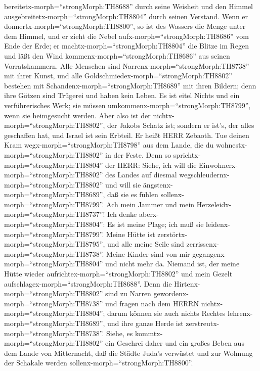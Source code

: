 bereitetx-morph=``strongMorph:TH8688'' durch seine Weisheit und den
Himmel ausgebreitetx-morph=``strongMorph:TH8804'' durch seinen Verstand.
 Wenn er donnertx-morph=``strongMorph:TH8800'', so ist des
Wassers die Menge unter dem Himmel, und er zieht die Nebel
aufx-morph=``strongMorph:TH8686'' vom Ende der Erde; er
machtx-morph=``strongMorph:TH8804'' die Blitze im Regen und läßt den
Wind kommenx-morph=``strongMorph:TH8686'' aus seinen Vorratskammern.
 Alle Menschen sind Narrenx-morph=``strongMorph:TH8738''
mit ihrer Kunst, und alle Goldschmiedex-morph=``strongMorph:TH8802''
bestehen mit Schandenx-morph=``strongMorph:TH8689'' mit ihren Bildern;
denn ihre Götzen sind Trügerei und haben kein Leben.  Es
ist eitel Nichts und ein verführerisches Werk; sie müssen
umkommenx-morph=``strongMorph:TH8799'', wenn sie heimgesucht werden.
 Aber also ist der nichtx-morph=``strongMorph:TH8802'', der
Jakobs Schatz ist; sondern er ist's, der alles geschaffen hat, und
Israel ist sein Erbteil. Er heißt HERR Zebaoth.  Tue deinen
Kram wegx-morph=``strongMorph:TH8798'' aus dem Lande, die du
wohnestx-morph=``strongMorph:TH8802'' in der Feste.  Denn
so sprichtx-morph=``strongMorph:TH8804'' der HERR: Siehe, ich will die
Einwohnerx-morph=``strongMorph:TH8802'' des Landes auf diesmal
wegschleudernx-morph=``strongMorph:TH8802'' und will sie
ängstenx-morph=``strongMorph:TH8689'', daß sie es fühlen
sollenx-morph=``strongMorph:TH8799''.  Ach mein Jammer und
mein Herzeleidx-morph=``strongMorph:TH8737''! Ich denke
aberx-morph=``strongMorph:TH8804'': Es ist meine Plage; ich muß sie
leidenx-morph=``strongMorph:TH8799''.  Meine Hütte ist
zerstörtx-morph=``strongMorph:TH8795'', und alle meine Seile sind
zerrissenx-morph=``strongMorph:TH8738''. Meine Kinder sind von mir
gegangenx-morph=``strongMorph:TH8804'' und nicht mehr da. Niemand ist,
der meine Hütte wieder aufrichtex-morph=``strongMorph:TH8802'' und mein
Gezelt aufschlagex-morph=``strongMorph:TH8688''.  Denn die
Hirtenx-morph=``strongMorph:TH8802'' sind zu Narren
gewordenx-morph=``strongMorph:TH8738'' und fragen nach dem HERRN
nichtx-morph=``strongMorph:TH8804''; darum können sie auch nichts
Rechtes lehrenx-morph=``strongMorph:TH8689'', und ihre ganze Herde ist
zerstreutx-morph=``strongMorph:TH8738''.  Siehe, es
kommtx-morph=``strongMorph:TH8802'' ein Geschrei daher und ein großes
Beben aus dem Lande von Mitternacht, daß die Städte Juda's verwüstet und
zur Wohnung der Schakale werden sollenx-morph=``strongMorph:TH8800''.
